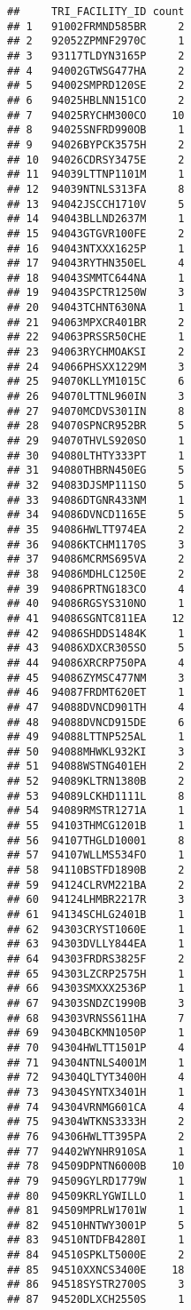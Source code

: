 \documentclass[
]{book}
\begin{document}
\begin{verbatim}
##     TRI_FACILITY_ID count
## 1   91002FRMND585BR     2
## 2   92052ZPMNF2970C     1
## 3   93117TLDYN3165P     2
## 4   94002GTWSG477HA     2
## 5   94002SMPRD120SE     2
## 6   94025HBLNN151CO     2
## 7   94025RYCHM300CO    10
## 8   94025SNFRD990OB     1
## 9   94026BYPCK3575H     2
## 10  94026CDRSY3475E     2
## 11  94039LTTNP1101M     1
## 12  94039NTNLS313FA     8
## 13  94042JSCCH1710V     5
## 14  94043BLLND2637M     1
## 15  94043GTGVR100FE     2
## 16  94043NTXXX1625P     1
## 17  94043RYTHN350EL     4
## 18  94043SMMTC644NA     1
## 19  94043SPCTR1250W     3
## 20  94043TCHNT630NA     1
## 21  94063MPXCR401BR     2
## 22  94063PRSSR50CHE     1
## 23  94063RYCHMOAKSI     2
## 24  94066PHSXX1229M     3
## 25  94070KLLYM1015C     6
## 26  94070LTTNL960IN     3
## 27  94070MCDVS301IN     8
## 28  94070SPNCR952BR     5
## 29  94070THVLS920SO     1
## 30  94080LTHTY333PT     1
## 31  94080THBRN450EG     5
## 32  94083DJSMP111SO     5
## 33  94086DTGNR433NM     1
## 34  94086DVNCD1165E     5
## 35  94086HWLTT974EA     2
## 36  94086KTCHM1170S     3
## 37  94086MCRMS695VA     2
## 38  94086MDHLC1250E     2
## 39  94086PRTNG183CO     4
## 40  94086RGSYS310NO     1
## 41  94086SGNTC811EA    12
## 42  94086SHDDS1484K     1
## 43  94086XDXCR305SO     5
## 44  94086XRCRP750PA     4
## 45  94086ZYMSC477NM     3
## 46  94087FRDMT620ET     1
## 47  94088DVNCD901TH     4
## 48  94088DVNCD915DE     6
## 49  94088LTTNP525AL     1
## 50  94088MHWKL932KI     3
## 51  94088WSTNG401EH     2
## 52  94089KLTRN1380B     2
## 53  94089LCKHD1111L     8
## 54  94089RMSTR1271A     1
## 55  94103THMCG1201B     1
## 56  94107THGLD10001     8
## 57  94107WLLMS534FO     1
## 58  94110BSTFD1890B     2
## 59  94124CLRVM221BA     2
## 60  94124LHMBR2217R     3
## 61  94134SCHLG2401B     1
## 62  94303CRYST1060E     1
## 63  94303DVLLY844EA     1
## 64  94303FRDRS3825F     2
## 65  94303LZCRP2575H     1
## 66  94303SMXXX2536P     1
## 67  94303SNDZC1990B     3
## 68  94303VRNSS611HA     7
## 69  94304BCKMN1050P     1
## 70  94304HWLTT1501P     4
## 71  94304NTNLS4001M     1
## 72  94304QLTYT3400H     4
## 73  94304SYNTX3401H     1
## 74  94304VRNMG601CA     4
## 75  94304WTKNS3333H     2
## 76  94306HWLTT395PA     2
## 77  94402WYNHR910SA     1
## 78  94509DPNTN6000B    10
## 79  94509GYLRD1779W     1
## 80  94509KRLYGWILLO     1
## 81  94509MPRLW1701W     1
## 82  94510HNTWY3001P     5
## 83  94510NTDFB4280I     1
## 84  94510SPKLT5000E     2
## 85  94510XXNCS3400E    18
## 86  94518SYSTR2700S     3
## 87  94520DLXCH2550S     1

\end{verbatim}
\end{document}
